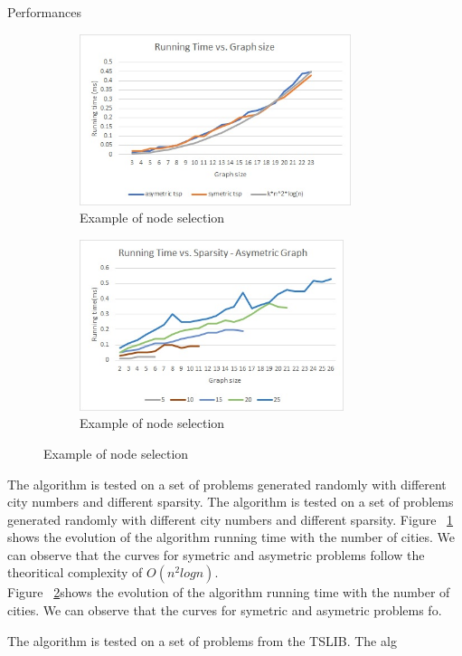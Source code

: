 \documentclass[../report.tex]{subfiles}
\begin{document}
\begin{subsection}{Performances}


\begin{figure}[H]
\centering
\begin{subfigure}{.5\textwidth}
\includegraphics[height=5cm,valign=t]{../Images/perf_random_graphsize.jpg}
\caption{Example of node selection \label{fig:randomgraphsize}}
\end{subfigure}%
\begin{subfigure}{.5\textwidth}
\includegraphics[height=5cm,valign=t]{../Images/perf_random_sparsity.jpg}
\caption{Example of node selection \label{fig:randomsparsity}}
\end{subfigure}%
\caption{Example of node selection \label{fig:randomperf}}
\end{figure}

The algorithm is tested on a set of problems generated randomly with different city numbers and different sparsity.
The algorithm is tested on a set of problems generated randomly with different city numbers and different sparsity.
Figure ~\ref{fig:randomgraphsize} shows the evolution of the algorithm running time with the number of cities. We can observe that the curves for symetric and asymetric problems follow the theoritical complexity of $O(n^2 log n)$. \\
Figure ~\ref{fig:randomsparsity}shows the evolution of the algorithm running time with the number of cities. We can observe that the curves for symetric and asymetric problems fo.



The algorithm is tested on a set of problems from the TSLIB.
The alg

\end{subsection}
\end{document}
